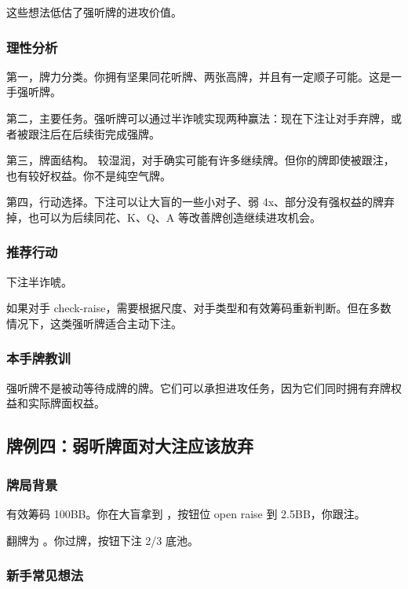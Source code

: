 这些想法低估了强听牌的进攻价值。

\subsubsection*{理性分析}

第一，牌力分类。你拥有坚果同花听牌、两张高牌，并且有一定顺子可能。这是一手强听牌。

第二，主要任务。强听牌可以通过半诈唬实现两种赢法：现在下注让对手弃牌，或者被跟注后在后续街完成强牌。

第三，牌面结构。 较湿润，对手确实可能有许多继续牌。但你的牌即使被跟注，也有较好权益。你不是纯空气牌。

第四，行动选择。下注可以让大盲的一些小对子、弱 4x、部分没有强权益的牌弃掉，也可以为后续同花、K、Q、A 等改善牌创造继续进攻机会。

\subsubsection*{推荐行动}

下注半诈唬。

如果对手 check-raise，需要根据尺度、对手类型和有效筹码重新判断。但在多数情况下，这类强听牌适合主动下注。

\subsubsection*{本手牌教训}

强听牌不是被动等待成牌的牌。它们可以承担进攻任务，因为它们同时拥有弃牌权益和实际牌面权益。

\subsection{牌例四：弱听牌面对大注应该放弃}

\subsubsection*{牌局背景}

有效筹码 100BB。你在大盲拿到 ，按钮位 open raise 到 2.5BB，你跟注。

翻牌为 。你过牌，按钮下注 2/3 底池。

\subsubsection*{新手常见想法}

